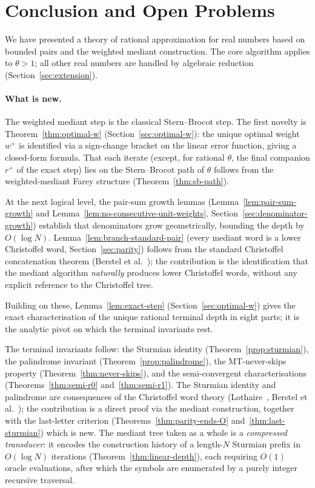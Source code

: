 \documentclass[12pt]{article}
\theoremstyle{definition}
\theoremstyle{remark}
\theoremstyle{plain}
\newcommand{\wplus}{w^{+}}
\begin{document}
\section{Conclusion and Open Problems}
\label{sec:conclusion}

We have presented a theory of rational approximation for real numbers based on
bounded pairs and the weighted mediant construction.
The core algorithm applies to $\theta > 1$; all other real numbers are handled by
algebraic reduction (Section~\ref{sec:extension}).

\paragraph{What is new.}
The weighted mediant step is the classical Stern--Brocot step.
The first novelty is Theorem~\ref{thm:optimal-w} (Section~\ref{sec:optimal-w}):
the unique optimal weight $\wplus$ is identified via a sign-change bracket on the
linear error function, giving a closed-form formula.
That each iterate (except, for rational $\theta$, the final companion $r^+$ of the
exact step) lies on the Stern--Brocot path of $\theta$ follows from the
weighted-mediant Farey structure (Theorem~\ref{thm:sb-path}).

At the next logical level, the pair-sum growth lemmas
(Lemma~\ref{lem:pair-sum-growth} and Lemma~\ref{lem:no-consecutive-unit-weights},
Section~\ref{sec:denominator-growth}) establish that denominators grow geometrically,
bounding the depth by $O(\log N)$.
Lemma~\ref{lem:branch-standard-pair} (every mediant word is a lower Christoffel word,
Section~\ref{sec:parity}) follows from the standard Christoffel concatenation theorem
(Berstel et al.~\cite{berstel2009}); the contribution is the identification that the
mediant algorithm \emph{naturally} produces lower Christoffel words, without any
explicit reference to the Christoffel tree.

Building on these, Lemma~\ref{lem:exact-step} (Section~\ref{sec:optimal-w}) gives
the exact characterisation of the unique rational terminal depth in eight parts;
it is the analytic pivot on which the terminal invariants rest.

The terminal invariants follow: the Sturmian identity
(Theorem~\ref{prop:sturmian}), the palindrome invariant (Theorem~\ref{prop:palindrome}),
the MT-never-skips property (Theorem~\ref{thm:never-skips}), and the
semi-convergent characterisations (Theorems~\ref{thm:semi-r0} and~\ref{thm:semi-r1}).
The Sturmian identity and palindrome are consequences of the Christoffel word theory
(Lothaire~\cite{lothaire2002}, Berstel et al.~\cite{berstel2009}); the contribution
is a direct proof via the mediant construction, together with the last-letter criterion
(Theorems~\ref{thm:parity-ends-O} and~\ref{thm:last-sturmian}) which is new.
The mediant tree taken as a whole is a \emph{compressed transducer}: it encodes the
construction history of a length-$N$ Sturmian prefix in $O(\log N)$ iterations
(Theorem~\ref{thm:linear-depth}), each requiring $O(1)$ oracle evaluations,
after which the symbols are enumerated by a purely integer recursive traversal.
\end{document}
